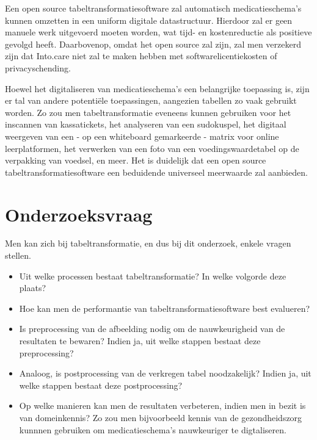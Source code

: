 Een open source tabeltransformatiesoftware zal automatisch medicatieschema’s kunnen omzetten in een uniform digitale datastructuur. Hierdoor zal er geen manuele werk uitgevoerd moeten worden, wat tijd- en kostenreductie als positieve gevolgd heeft. Daarbovenop, omdat het open source zal zijn, zal men verzekerd zijn dat Into.care niet zal te maken hebben met softwarelicentiekosten of privacyschending.


Hoewel het digitaliseren van medicatieschema’s een belangrijke toepassing is, zijn er tal van andere potentiële toepassingen, aangezien tabellen zo vaak gebruikt worden. Zo zou men tabeltransformatie eveneens kunnen gebruiken voor het inscannen van kassatickets, het analyseren van een sudokuspel, het digitaal weergeven van een - op een whiteboard gemarkeerde - matrix voor online leerplatformen, het verwerken van een foto van een voedingswaardetabel op de verpakking van voedsel, en meer. Het is duidelijk dat een open source tabeltransformatiesoftware een beduidende universeel meerwaarde zal aanbieden.


\section{Onderzoeksvraag}
\label{sec:onderzoeksvraag}

Men kan zich bij tabeltransformatie, en dus bij dit onderzoek, enkele vragen stellen.

\begin{itemize}
    \item Uit welke processen bestaat tabeltransformatie? In welke volgorde deze plaats?
    \item Hoe kan men de performantie van tabeltransformatiesoftware best evalueren?
    \item Is preprocessing van de afbeelding nodig om de nauwkeurigheid van de resultaten te bewaren? Indien ja, uit welke stappen bestaat deze preprocessing?
    \item Analoog, is postprocessing van de verkregen tabel noodzakelijk? Indien ja, uit welke stappen bestaat deze postprocessing?
    \item Op welke manieren kan men de resultaten verbeteren, indien men in bezit is van domeinkennis? Zo zou men bijvoorbeeld kennis van de gezondheidszorg kunnnen gebruiken om medicatieschema’s nauwkeuriger te digtaliseren.
\end{itemize}

